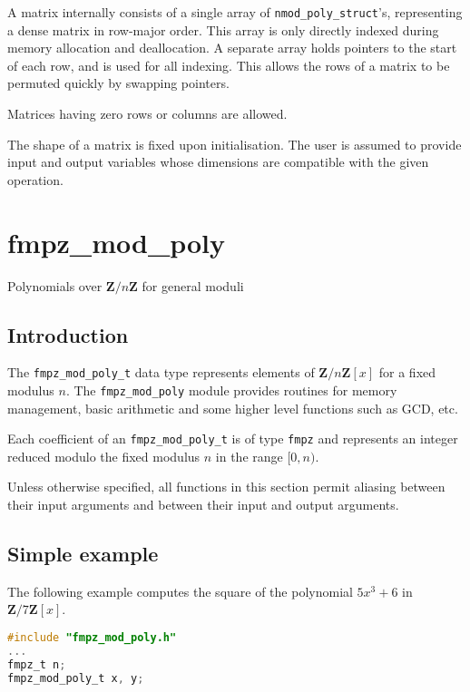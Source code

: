 \documentclass[a4paper,10pt]{book}
\newcommand{\Z}{\mathbf{Z}}%
\newcommand{\code}{\lstinline}
\begin{document}
{{A matrix internally consists of a single array
of \code{nmod_poly_struct}'s, representing a dense matrix in
row-major order. This array is only directly indexed
during memory allocation and deallocation. A separate array
holds pointers to the start of each row, and is used for all
indexing. This allows the rows of a matrix to be permuted
quickly by swapping pointers.

Matrices having zero rows or columns are allowed.

The shape of a matrix is fixed upon initialisation.
The user is assumed to provide input and output variables
whose dimensions are compatible with the given operation.




\chapter{fmpz\_mod\_poly}
\epigraph{Polynomials over $\Z / n \Z$ for general moduli}{}

\section{Introduction}

The \code{fmpz_mod_poly_t} data type represents elements of $\Z/n\Z[x]$ for
a fixed modulus $n$. The \code{fmpz_mod_poly} module provides routines for
memory management, basic arithmetic and some higher level functions
such as GCD, etc.

Each coefficient of an \code{fmpz_mod_poly_t} is of type \code{fmpz}
and represents an integer reduced modulo the fixed modulus $n$ in the
range $[0,n)$.

Unless otherwise specified, all functions in this section permit aliasing
between their input arguments and between their input and output arguments.

\section{Simple example}

The following example computes the square of the polynomial $5x^3 + 6$
in $\Z/7\Z[x]$.
\begin{lstlisting}[language=c]
#include "fmpz_mod_poly.h"
...
fmpz_t n;
fmpz_mod_poly_t x, y;


\end{lstlisting}}}
\end{document}
